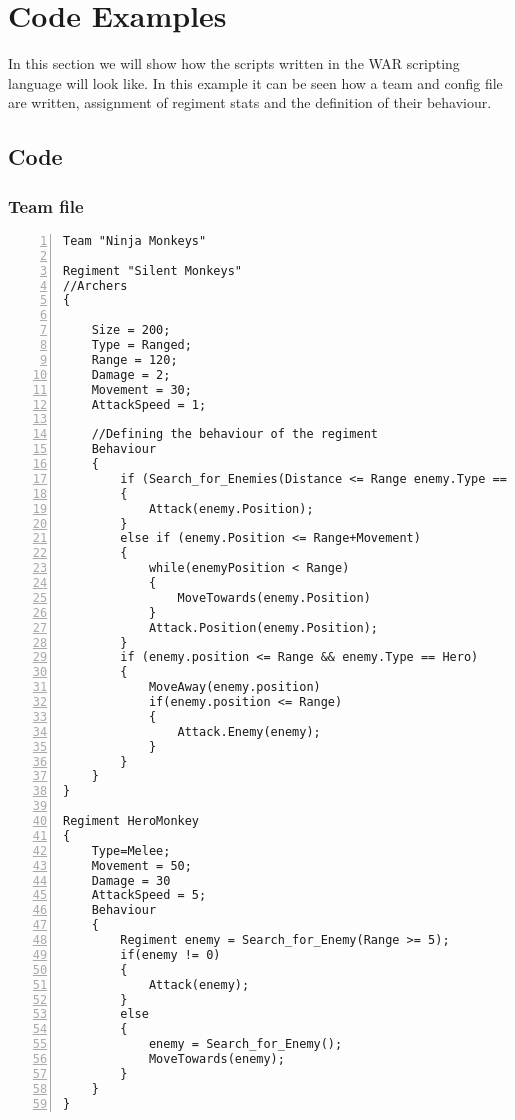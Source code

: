 \section{Code Examples}
	In this section we will show how the scripts written in the WAR scripting language will look like.
	In this example it can be seen how a team and config file are written, assignment of regiment stats and the definition of their behaviour.
	\subsection{Code}
		\subsubsection{Team file}
					\begin{lstlisting}[basicstyle=\small\sffamily,
					keywords={break,case,const,continue,default,else,enum,
					for,if,return,switch,while,do,long,void,int,float,double,
					char,struct,typedef,include,size\_t},
					keywordstyle={\color{blue}},
					comment={[l]{//}}, morecomment={[s]{/*}{*/}}, commentstyle=\itshape,
					columns={[l]flexible}, numbers=left, numberstyle=\tiny,
					frameround=fftt, frame=shadowbox, captionpos=b,
					caption={Team file of code example 3},
					label=LST:code31]
Team "Ninja Monkeys"

Regiment "Silent Monkeys"
//Archers
{
	
	Size = 200;
	Type = Ranged;
	Range = 120;
	Damage = 2;
	Movement = 30;
	AttackSpeed = 1;
	
	//Defining the behaviour of the regiment
	Behaviour
	{
		if (Search_for_Enemies(Distance <= Range enemy.Type == Melee))
		{
			Attack(enemy.Position);
		}
		else if (enemy.Position <= Range+Movement)
		{
			while(enemyPosition < Range)
			{
				MoveTowards(enemy.Position)
			}
			Attack.Position(enemy.Position);
		}
		if (enemy.position <= Range && enemy.Type == Hero)
		{
			MoveAway(enemy.position)
			if(enemy.position <= Range)
			{
				Attack.Enemy(enemy);
			}
		}
	}
}

Regiment HeroMonkey
{
	Type=Melee;
	Movement = 50;
	Damage = 30
	AttackSpeed = 5;
	Behaviour
	{
		Regiment enemy = Search_for_Enemy(Range >= 5);
		if(enemy != 0)
		{
			Attack(enemy);
		}
		else
		{
			enemy = Search_for_Enemy();
			MoveTowards(enemy);
		}
	}
}
					\end{lstlisting}
